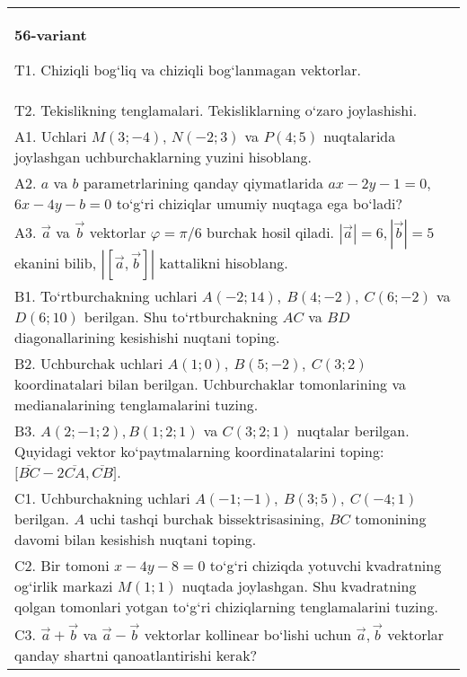 \documentclass{article}
\begin{document}
\begin{tabular}{m{17cm}}
\textbf{56-variant}
\newline

T1. 
Chiziqli bog‘liq va chiziqli bog‘lanmagan vektorlar.
 \\
T2. 
Tekislikning tenglamalari. Tekisliklarning o‘zaro joylashishi.
 \\
A1. 
Uchlari $M (3;-4) $, $N (-2;3) $ va $P (4;5) $
nuqtalarida joylashgan uchburchaklarning yuzini hisoblang.
 \\
A2. 
$a$ va $b$ parametrlarining qanday qiymatlarida
$ax-2y-1=0$, $6x-4y-b=0$ to‘g‘ri chiziqlar umumiy nuqtaga ega bo‘ladi?
 \\
A3. 
$\overrightarrow{a}$ va $\overrightarrow{b}$ vektorlar
$\varphi = \pi/6$ burchak hosil qiladi.
$|\overrightarrow{a}| = 6,|\overrightarrow{b}| = 5$ ekanini bilib,
$\left| \left\lbrack \overrightarrow{a},\overrightarrow{b} \right\rbrack \right|$ kattalikni hisoblang.
 \\
B1. 
To‘rtburchakning uchlari
\(A (-2;14),\ B (4;-2),\ C (6;-2) \) va \(D (6;10) \) berilgan. Shu
to‘rtburchakning $AC$ va $BD$ diagonallarining kesishishi
nuqtani toping.
 \\
B2. 
Uchburchak uchlari \(A (1;0),\ B (5;-2),\ C (3;2) \)
koordinatalari bilan berilgan. Uchburchaklar tomonlarining va
medianalarining tenglamalarini tuzing.
 \\
B3. 
$A (2; -1;2),B (1;2; 1) $ va $C (3;2;1) $ nuqtalar berilgan. Quyidagi vektor ko‘paytmalarning koordinatalarini toping:
$\lbrack\overline{BC} - 2\overline{CA},\overline{CB}\rbrack$. \\
C1. 
Uchburchakning uchlari
\(A (- 1; - 1),\ B (3;5),\ C (- 4;1) \) berilgan. $A$ uchi tashqi
burchak bissektrisasining, $BC$ tomonining davomi bilan kesishish
nuqtani toping.
 \\
C2. 
Bir tomoni \(x-4y - 8 = 0\) to‘g‘ri chiziqda yotuvchi
kvadratning og‘irlik markazi \(M (1;1) \) nuqtada joylashgan. Shu kvadratning
qolgan tomonlari yotgan to‘g‘ri chiziqlarning tenglamalarini tuzing.
 \\
C3. 
\(\vec{a}+\vec{b}\) va \(\vec{a} - \vec{b}\) vektorlar kollinear bo‘lishi uchun \(\vec{a},\vec{b}\) vektorlar qanday shartni qanoatlantirishi kerak?
 \\

\end{tabular}
\vspace{1cm}
\end{document}
